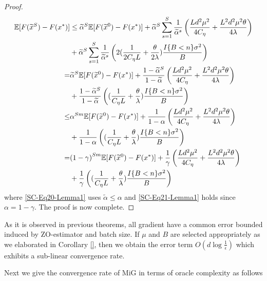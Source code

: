 \documentclass{article}
\newcommand*{\E}{\mathbb{E}}
\theoremstyle{definition}
\theoremstyle{remark}
\begin{document}
{\begin{proof}
{\color{blue}
\begin{align}
\E[F(\widetilde{x}^S) - F(x^*)] & \leq \widetilde{\alpha}^{S} \E[F(\widetilde{x}^0) - F({x}^*)] +\widetilde{\alpha}^{S} \sum_{s=1}^S \frac{1}{\widetilde{\alpha}^s}\left(\frac{Ld^2\mu^2}{4C_{\eta}}+\frac{ L^2d^2\mu^2\theta}{4\lambda}\right)\notag\\
&+\widetilde{\alpha}^{S} \sum_{s=1}^S \frac{1}{\widetilde{\alpha}^s}\left(2(\frac{1}{2C_{\eta} L}+\frac{\theta}{2\lambda})\frac{I\{B < n\} \sigma ^2}{B}\right)\notag\\
 =& \widetilde{\alpha}^{S} \E[F(\widetilde{x}^0) - F(x^*)]+\frac{1-\widetilde{\alpha}^S}{1-\widetilde{\alpha}}\left(\frac{Ld^2\mu^2}{4C_{\eta}}+\frac{ L^2d^2\mu^2\theta}{4\lambda}\right)\notag\\
&+ \frac{1-\widetilde{\alpha}^S}{1-\widetilde{\alpha}}\left((\frac{1}{C_{\eta} L}+\frac{\theta}{\lambda})\frac{I\{B < n\} \sigma ^2}{B}\right)\notag\\
 \leq& {\alpha}^{Sm} \E[F(\widetilde{x}^0) - F(x^*)]+\frac{1}{1-{\alpha}}\left(\frac{Ld^2\mu^2}{4C_{\eta}}+\frac{ L^2d^2\mu^2\theta}{4\lambda}\right)\notag\\
&+ \frac{1}{1-{\alpha}}\left((\frac{1}{C_{\eta} L}+\frac{\theta}{\lambda})\frac{I\{B < n\} \sigma ^2}{B}\right)\label{SC-Eq20-Lemma1}\\
 =& {(1-\gamma)}^{Sm} \E[F(\widetilde{x}^0) - F(x^*)]+\frac{1}{{\gamma}}\left(\frac{Ld^2\mu^2}{4C_{\eta}}+\frac{ L^2d^2\mu^2\theta}{4\lambda}\right)\notag\\
&+ \frac{1}{\gamma}\left((\frac{1}{C_{\eta} L}+\frac{\theta}{\lambda})\frac{I\{B < n\} \sigma ^2}{B}\right)\label{SC-Eq21-Lemma1}
\end{align}
}
where \eqref{SC-Eq20-Lemma1} uses $\widetilde{\alpha} \leq \alpha$ and \eqref{SC-Eq21-Lemma1}  holds since $\alpha = 1-\gamma$. The proof is now complete.
\end{proof}
}
As it is observed in previous theorems, all gradient have a common error bounded induced by ZO-estimator and batch size.
If $\mu$  and $B$ are selected appropriately as we elaborated in Corollary \ref{}, then we obtain the error term $O(d\log \frac{1}{\epsilon})$ which exhibits a sub-linear convergence rate.

{\color{DarkOrchid}
Next we give the convergence rate of MiG in terms of oracle complexity as follows
}
\end{document}
